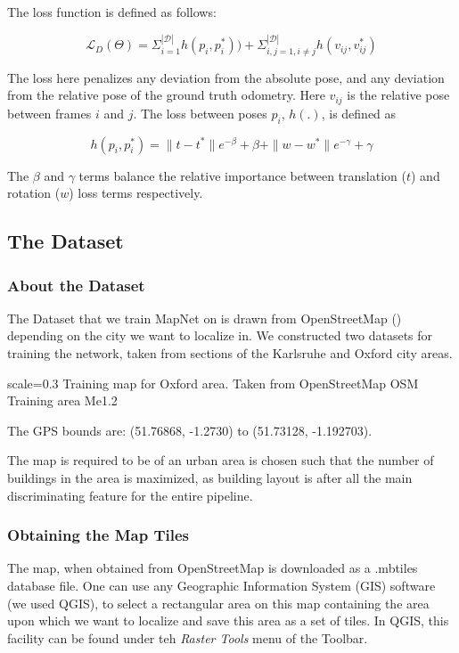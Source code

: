 The loss function is defined as follows:

\[ \mathcal{L}_D(\Theta)= \Sigma_{i=1}^{|\mathcal{D}|}h(p_i,p_i^{*})) + \Sigma_{i,j=1, i\neq j}^{|\mathcal{D}|}h(v_{ij},v_{ij}^{*}) \] 

The loss here penalizes any deviation from the absolute pose, and any deviation from the relative pose of the ground truth odometry. Here $v_{ij}$ is the relative pose between frames $i$ and $j$. The loss between poses $p_i$, $h(.)$, is defined as

\[ h(p_i,p_i^{*}) = \|t - t^*\|e^{-\beta} + \beta + \|w - w^*\|e^{-\gamma} + \gamma \]

The $\beta$ and $\gamma$ terms balance the relative importance between translation ($t$) and rotation ($w$) loss terms respectively. 

\subsection{The Dataset}

\subsubsection{About the Dataset}
The Dataset that we train MapNet on is drawn from OpenStreetMap (\cite{osm2017}) depending on the city we want to localize in. We constructed two datasets for training the network, taken from sections of the Karlsruhe and Oxford city areas.

{scale=0.3}%
{Training map for Oxford area. Taken from OpenStreetMap}%
{OSM Training area}%
{Me1.2}

The GPS bounds are: (51.76868, -1.2730) to (51.73128, -1.192703).

The map is required to be of an urban area is chosen such that the number of buildings in the area is maximized, as building layout is after all the main discriminating feature for the entire pipeline. 

\subsubsection{Obtaining the Map Tiles}
The map, when obtained from OpenStreetMap is downloaded as a .mbtiles database file. One can use any Geographic Information System (GIS) software (we used QGIS), to select a rectangular area on this map containing the area upon which we want to localize and save this area as a set of tiles. In QGIS, this facility can be found under teh \emph{Raster Tools} menu of the Toolbar.

